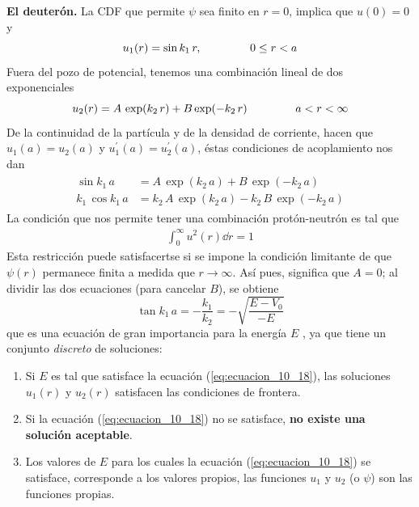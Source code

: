\begin{ejemplo}{\textbf{El deuterón.}}
La CDF que permite $\psi$ sea finito en $r = 0$, implica que $u(0) = 0$ y
\begin{equation}
u_{1}(r) = \sin k_{1} \, r, \hspace{1.5cm} 0 \leq r < a
\label{eq:ecuacion_10_15}
\end{equation}
Fuera del pozo de potencial, tenemos una combinación lineal de dos exponenciales
\begin{equation}
u_{2}(r) = A \, \exp(k_{2} \, r) + B \exp(-k_{2} \, r) \hspace{1.5cm} a < r < \infty
\label{eq:ecuacion_10_16}
\end{equation}
De la continuidad de la partícula y de la densidad de corriente, hacen que $u_{1}(a) = u_{2}(a)$ y $u^{\prime}_{1}(a) = u^{\prime}_{2}(a)$, éstas condiciones de acoplamiento nos dan
\begin{align}
\begin{aligned}
\sin k_{1} \, a &= A \, \exp(k_{2} \, a) + B \, \exp(- k_{2} \, a) \\
k_{1} \, \cos k_{1} \, a &= k_{2} \, A \, \exp(k_{2} \, a) - k_{2} \, B \, \exp(- k_{2} \, a)
\end{aligned}
\label{eq:ecuacion_10_17}
\end{align}
La condición que nos permite tener una combinación protón-neutrón es tal que
\begin{align*}
\int_{0}^{\infty} u^{2}(r) \dd{r} = 1
\end{align*}
Esta restricción puede satisfacertse si se impone la condición limitante de que $\psi(r)$ permanece finita a medida que $r \to \infty$. Así pues, significa que $A = 0$; al dividir las dos ecuaciones (para cancelar $B$), se obtiene
\begin{equation}
\tan k_{1} \, a = - \dfrac{k_{1}}{k_{2}} = - \sqrt{\dfrac{E - V_{0}}{- E}} 
\label{eq:ecuacion_10_18}
\end{equation}
que es una ecuación de gran importancia para la energía $E$ , ya que tiene un conjunto \emph{discreto} de soluciones:
\begin{enumerate}
\item Si $E$ es tal que satisface la ecuación (\ref{eq:ecuacion_10_18}), las soluciones $u_{1}(r)$ y $u_{2}(r)$ satisfacen las condiciones de frontera.
\item Si la ecuación (\ref{eq:ecuacion_10_18}) no se satisface, \textbf{no existe una solución aceptable}.
\item Los valores de $E$ para los cuales la ecuación (\ref{eq:ecuacion_10_18}) se satisface, corresponde a los valores propios, las funciones $u_{1}$ y $u_{2}$ (o $\psi$) son las funciones propias.

\end{enumerate}
\end{ejemplo}
